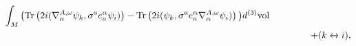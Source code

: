\documentclass[letterpaper,11pt]{article}
\newcommand{\nn}{\nonumber}
\def\a{\alpha}
\def\e{\epsilon}
\def\m{\mu}
\def\n{\nu}
\def\oo{\omega}
\begin{document}
\begin{eqnarray}
 \int_M \big( 
  \mbox{Tr} \left(            2i  ( \nabla^{A,\oo}_\a \psi_k, \sigma^a e_a^\a  \psi_i)    \right)   
-  \mbox{Tr} \left(      2i   (\psi_k, \sigma^a e_a^\a \nabla^{A,\oo}_\a \psi_i)   \right)
    \big)d^{(3)}\mbox{vol}
 \nn\\
&&\hspace{1,2cm} +  (k \leftrightarrow i),
\label{corona}
\end{eqnarray}
\end{document}
